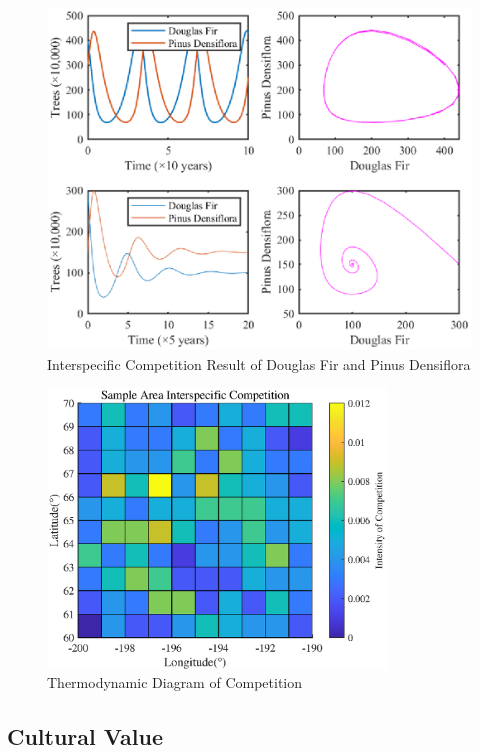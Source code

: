\documentclass{mcmthesis}
\numberwithin{figure}{section}
\numberwithin{table}{section}
\numberwithin{equation}{section}
\begin{document}
\begin{figure}[htbp]
  \centering
  \includegraphics[width = 14cm]{code&pic/Interspecies.eps}
  \caption{Interspecific Competition Result of Douglas Fir and Pinus Densiflora}\label{Douglas Fir and Pinus Densiflora result}
\end{figure}

\begin{figure}[htbp]
  \centering
  \includegraphics[width = 9cm]{code&pic/Interspecies-matrix.eps}
  \caption{Thermodynamic Diagram of Competition}\label{Matrix Douglas Fir and Pinus Densiflora}
\end{figure}

\subsection{Cultural Value}
\end{document}
